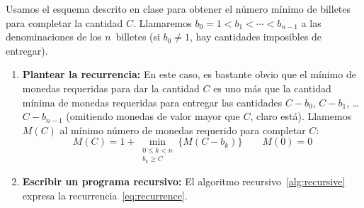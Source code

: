 \documentclass[english, spanish, fleqn]{article}
\begin{document}
  Usamos el esquema descrito en clase para obtener el número mínimo
  de billetes para completar la cantidad \(C\).
  Llamaremos \(b_0 = 1 < b_1 < \dotsb < b_{n - 1}\)
  a las denominaciones de los \(n\)~billetes
  (si \(b_0 \ne 1\),
   hay cantidades imposibles de entregar).
  \begin{enumerate}[label = {(\alph*)}]
  \item \textbf{Plantear la recurrencia:}
    En este caso,
    es bastante obvio que el mínimo de monedas requeridas
    para dar la cantidad \(C\)
    es uno más que la cantidad mínima de monedas
    requeridas para entregar
    las cantidades \(C - b_0\), \(C - b_1\), \ldots \(C - b_{n - 1}\)
    (omitiendo monedas de valor mayor que \(C\),
     claro está).
    Llamemos \(M(C)\) al mínimo número de monedas
    requerido para completar \(C\):
    \begin{equation}
      \label{eq:recurrence}
      M(C)
        = 1 + \min_{\substack{
                      0 \le k < n \\
                      b_k \ge C}}
                \{M(C - b_k)\}
      \qquad
      M(0)
        = 0
    \end{equation}
  \item \textbf{Escribir un programa recursivo:}
    El algoritmo recursivo~\ref{alg:recursive}
    expresa la recurrencia~\eqref{eq:recurrence}.
    \begin{algorithm}
      \DontPrintSemicolon\Indp



\end{algorithm}
\end{enumerate}
\end{document}

